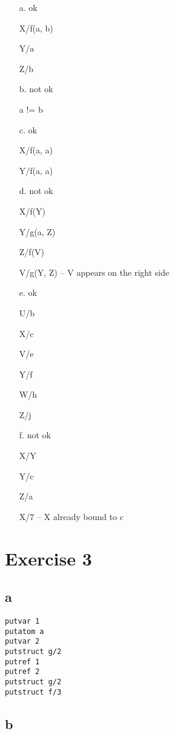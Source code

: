 \documentclass[10pt,a4paper]{article}
\begin{document}
\begin{enumerate}
	\item[a.] ok
	
	X/f(a, b)
	
	Y/a
	
	Z/b
	
	\item[b.] not ok
	
	a != b
	
	\item[c.] ok
	
	X/f(a, a)
	
	Y/f(a, a)
	
	\item[d.] not ok
	
	X/f(Y)
	
	Y/g(a, Z)
	
	Z/f(V)
	
	V/g(Y, Z) -- V appears on the right side
	
	\item[e.] ok
	
	U/b
	
	X/c
	
	V/e
	
	Y/f
	
	W/h
	
	Z/j
	
	\item[f.] not ok
	
	X/Y
	
	Y/c
	
	Z/a
	
	X/7 -- X already bound to c
\end{enumerate}

\section{Exercise 3}

\subsection{a}

	\begin{lstlisting}
putvar 1
putatom a
putvar 2
putstruct g/2
putref 1
putref 2
putstruct g/2
putstruct f/3
	\end{lstlisting}

\subsection{b}
\end{document}
